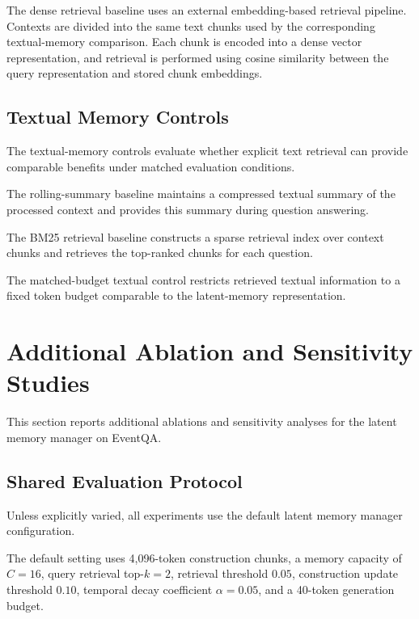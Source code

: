 \documentclass[letterpaper]{article}
\begin{document}
The dense retrieval baseline uses an external embedding-based retrieval
pipeline. Contexts are divided into the same text chunks used by the
corresponding textual-memory comparison. Each chunk is encoded into a dense
vector representation, and retrieval is performed using cosine similarity
between the query representation and stored chunk embeddings.



\subsection{Textual Memory Controls}
\label{sec:supp-text-memory}

The textual-memory controls evaluate whether explicit text retrieval can
provide comparable benefits under matched evaluation conditions.

The rolling-summary baseline maintains a compressed textual summary of the
processed context and provides this summary during question answering.

The BM25 retrieval baseline constructs a sparse retrieval index over context
chunks and retrieves the top-ranked chunks for each question.

The matched-budget textual control restricts retrieved textual information
to a fixed token budget comparable to the latent-memory representation.

\section{Additional Ablation and Sensitivity Studies}
\label{sec:supp-ablation}

This section reports additional ablations and sensitivity analyses
for the latent memory manager on EventQA.


\subsection{Shared Evaluation Protocol}
\label{sec:supp-protocol}

Unless explicitly varied, all experiments use the default latent memory
manager configuration.

The default setting uses 4,096-token construction chunks, a memory capacity
of \(C=16\), query retrieval top-\(k=2\), retrieval threshold \(0.05\),
construction update threshold \(0.10\), temporal decay coefficient
\(\alpha=0.05\), and a 40-token generation budget.
\end{document}
